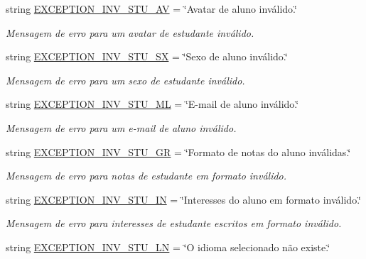 \begin{DoxyCompactItemize}
string \hyperlink{namespaceELO_1_1lang_1_1pt__br_aabe31490486b05d4ed70d699bae1f413}{E\-X\-C\-E\-P\-T\-I\-O\-N\-\_\-\-I\-N\-V\-\_\-\-S\-T\-U\-\_\-\-A\-V} = \char`\"{}Avatar de aluno inválido.\char`\"{}
\begin{DoxyCompactList}\small\item\em Mensagem de erro para um avatar de estudante inválido. \end{DoxyCompactList}\item 
string \hyperlink{namespaceELO_1_1lang_1_1pt__br_a040f9c2a2d61c951632c35b17e24f63e}{E\-X\-C\-E\-P\-T\-I\-O\-N\-\_\-\-I\-N\-V\-\_\-\-S\-T\-U\-\_\-\-S\-X} = \char`\"{}Sexo de aluno inválido.\char`\"{}
\begin{DoxyCompactList}\small\item\em Mensagem de erro para um sexo de estudante inválido. \end{DoxyCompactList}\item 
string \hyperlink{namespaceELO_1_1lang_1_1pt__br_ae55ddb893ecbbca5f9599c263077f8c9}{E\-X\-C\-E\-P\-T\-I\-O\-N\-\_\-\-I\-N\-V\-\_\-\-S\-T\-U\-\_\-\-M\-L} = \char`\"{}E-\/mail de aluno inválido.\char`\"{}
\begin{DoxyCompactList}\small\item\em Mensagem de erro para um e-\/mail de aluno inválido. \end{DoxyCompactList}\item 
string \hyperlink{namespaceELO_1_1lang_1_1pt__br_a52e9b4ddabc505da1471bed2b82ec8bd}{E\-X\-C\-E\-P\-T\-I\-O\-N\-\_\-\-I\-N\-V\-\_\-\-S\-T\-U\-\_\-\-G\-R} = \char`\"{}Formato de notas do aluno inválidas.\char`\"{}
\begin{DoxyCompactList}\small\item\em Mensagem de erro para notas de estudante em formato inválido. \end{DoxyCompactList}\item 
string \hyperlink{namespaceELO_1_1lang_1_1pt__br_a03f94f11d51e3124eea071051a30b0b5}{E\-X\-C\-E\-P\-T\-I\-O\-N\-\_\-\-I\-N\-V\-\_\-\-S\-T\-U\-\_\-\-I\-N} = \char`\"{}Interesses do aluno em formato inválido.\char`\"{}
\begin{DoxyCompactList}\small\item\em Mensagem de erro para interesses de estudante escritos em formato inválido. \end{DoxyCompactList}\item 
string \hyperlink{namespaceELO_1_1lang_1_1pt__br_a931b46af9287ef64fa4c73e99c914ebd}{E\-X\-C\-E\-P\-T\-I\-O\-N\-\_\-\-I\-N\-V\-\_\-\-S\-T\-U\-\_\-\-L\-N} = \char`\"{}O idioma selecionado não existe.\char`\"{}

\end{DoxyCompactItemize}
